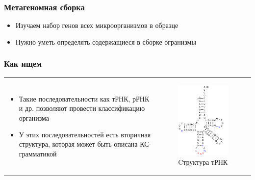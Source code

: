 \documentclass{beamer}
\begin{document}
 \begin{frame}
     \frametitle{Метагеномная сборка}
     \begin{itemize}
         \item Изучаем набор генов всех микроорганизмов в образце
         \item Нужно уметь определять содержащиеся в сборке огранизмы
     \end{itemize}
 \end{frame}
 
 \begin{frame}
     \frametitle{Как ищем}
     \begin{tabular}{p{6cm} p{5cm}}
         \begin{itemize}
             \item Такие последовательности как тРНК, рРНК и др. позволяют провести классификацию организма
             \item У этих последовательностей есть вторичная структура, которая может быть описана КС-грамматикой
         \end{itemize}
         &
         \vspace{-1cm}
         \begin{figure}[b]
             \centering
             \includegraphics[width=5.2cm]{pictures/TRNA.png}
             \caption{Cтруктура тРНК}
         \end{figure}
     \end{tabular}  
 \end{frame}
 
\end{document}
